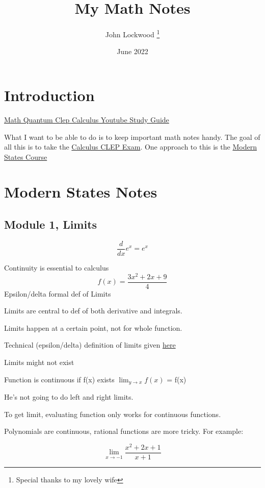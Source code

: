 \documentclass[12pt, letterpaper]{article}
\title{My Math Notes}
\author{John Lockwood \thanks{Special thanks to my lovely wife}}
\date{June 2022}
\begin{document}
\maketitle

\section{Introduction}

\href{https://www.youtube.com/playlist?list=PLldv_vDcl8CmToBgl9Hw_EQlVTXo3yWFt}{Math Quantum Clep Calculus Youtube Study Guide}

What I want to be able to do is to keep important math notes handy.
The goal of all this is to take the \href{https://clep.collegeboard.org/clep-exams/calculus}{Calculus CLEP Exam}.  
One approach to this is the \href{https://courses.modernstates.org/courses/course-v1:ModernStatesX+Calculus+2017/course/}{Modern States Course}
\section{Modern States Notes}
\subsection{Module 1, Limits}

\[ \frac{d}{dx} e^x = e^x \]

Continuity is essential to calculus
\[ f(x) = \frac{3x^{2} + 2x +9}{4} \]
Epsilon/delta formal def of Limits

Limits are central to def of both derivative and integrals.

Limits happen at a certain point, not for whole function.

Technical (epsilon/delta) definition of limits given \href{https://courses.modernstates.org/courses/course-v1:ModernStatesX+Calculus+2017/courseware/8f598eefb77a4cceb9d65d6ae993c417/4c2b909e818e421ba4a9e7aa31aba97f/?child=first}{here}

Limits might not exist

Function is continuous if f(x) exists \(\lim_{y \to x} f(x)\)  = f(x)

He's not going to do left and right limits.

To get limit, evaluating function only works for continuous functions.

Polynomials are continuous, rational functions are more tricky.  For example:

\[
    \lim_{x \to -1}\frac{x^2 + 2x + 1}{x + 1}
\]
\end{document}
